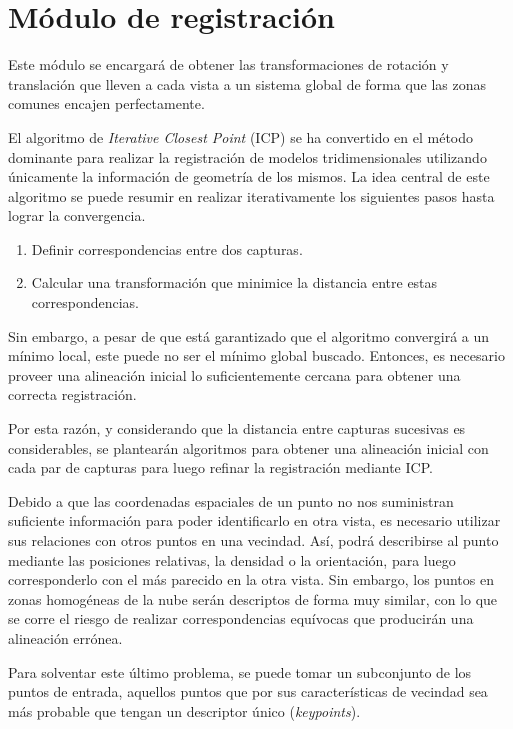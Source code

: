 \section{Módulo de registración}
	Este módulo se encargará de obtener las transformaciones de rotación y translación
	que lleven a cada vista a un sistema global de forma
	que las zonas comunes encajen perfectamente.



	El algoritmo de \emph{Iterative Closest Point} (ICP) se ha convertido en el
	método dominante para realizar la registración de modelos tridimensionales
	utilizando únicamente la información de geometría de los mismos.
	La idea central de este algoritmo se puede resumir en realizar
	iterativamente los siguientes pasos hasta lograr la convergencia.
	\begin{enumerate}
		\item Definir correspondencias entre dos capturas.
		\item Calcular una transformación que minimice la distancia entre estas correspondencias.
	\end{enumerate}
	Sin embargo, a pesar de que está garantizado que el algoritmo convergirá a un mínimo local,
	este puede no ser el mínimo global buscado. Entonces, es necesario proveer una alineación inicial
	lo suficientemente cercana para obtener una correcta registración.

	Por esta razón, y considerando que la distancia entre capturas sucesivas es
	considerables, se plantearán algoritmos para obtener una alineación inicial
	con cada par de capturas para luego refinar la registración mediante ICP.


	Debido a que las coordenadas espaciales de un punto no nos suministran suficiente
	información para poder identificarlo en otra vista, es necesario utilizar
	sus relaciones con otros puntos en una vecindad.
	Así, podrá describirse al punto mediante las posiciones relativas, la
	densidad o la orientación, para luego corresponderlo con el más parecido en
	la otra vista.
	Sin embargo, los puntos en zonas homogéneas de la nube serán descriptos de
	forma muy similar, con lo que se corre el riesgo de realizar
	correspondencias equívocas que producirán una alineación errónea.

	Para solventar este último problema, se puede tomar un subconjunto de los
	puntos de entrada, aquellos puntos que por sus características de vecindad
	sea más probable que tengan un descriptor único (\emph{keypoints}).

